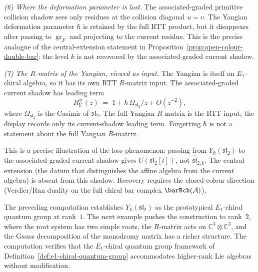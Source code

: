 \begin{computation}
\medskip
\noindent\emph{(6) Where the deformation parameter is lost.}
The associated-graded primitive collision shadow sees only residues at
the collision diagonal \(u=v\).  The Yangian deformation parameter
\(\hbar\) is retained by the full RTT product, but it disappears after
passing to \(\operatorname{gr}_F\) and projecting to the current
residue.  This is the precise analogue of the central-extension
statement in Proposition~\ref{prop:open-colour-double-bar}: the level
\(k\) is not recovered by the associated-graded current shadow.

\medskip
\noindent\emph{(7) The \(R\)-matrix of the Yangian,
viewed as input.}
The Yangian is itself an \(E_1\)-chiral algebra, so it has its own
RTT \(R\)-matrix input.  The associated-graded current shadow has
leading term
\begin{equation}\label{eq:yangian-r-matrix-own}
R_Y^{\operatorname{gr}}(z)
\;=\;
1 + \hbar\,\Omega_{\mathfrak{sl}_2}/z + O(z^{-2}),
\end{equation}
where $\Omega_{\mathfrak{sl}_2}$ is the Casimir of
\(\mathfrak{sl}_2\).  The full Yangian \(R\)-matrix is the RTT input;
the display records only its current-shadow leading term.  Forgetting
\(\hbar\) is not a statement about the full Yangian \(R\)-matrix.

This is a precise illustration of the loss phenomenon:
passing from \(Y_\hbar(\mathfrak{sl}_2)\) to the associated-graded
current shadow gives \(U(\mathfrak{sl}_2[t])\), not
\(\widehat{\mathfrak{sl}}_{2,k}\). The central extension (the datum
that distinguishes the affine algebra from the current algebra) is
absent from this shadow. Recovery requires the closed-colour direction
(Verdier/Ran duality on the full chiral bar complex \(\barBch(\cA)\)).
\end{computation}

The preceding computation establishes $Y_\hbar(\mathfrak{sl}_2)$
as the prototypical $E_1$-chiral quantum group at rank~$1$.
The next example pushes the construction to rank~$2$,
where the root system has two simple roots, the $R$-matrix
acts on $\mathbb{C}^3\otimes\mathbb{C}^3$, and the Gauss
decomposition of the monodromy matrix has a richer structure.
The computation verifies that the $E_1$-chiral quantum group
framework of Definition~\ref{def:e1-chiral-quantum-group}
accommodates higher-rank Lie algebras without modification.

